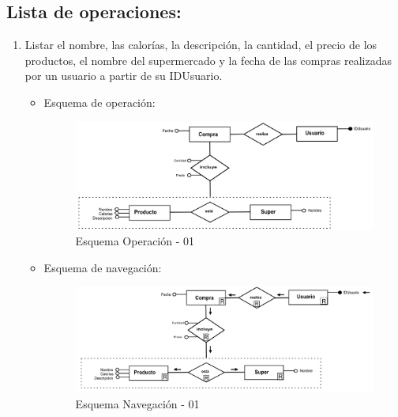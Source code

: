 \documentclass[a4paper,12pt]{report}
\begin{document}
\subsection{Lista de operaciones:}
\label{sec-7-1-1}
\begin{enumerate}
\item Listar el nombre, las calorías, la descripción, la cantidad, el precio de los productos, el nombre del supermercado y la fecha de las compras realizadas por un usuario a partir de su IDUsuario.
\begin{itemize}
\item Esquema de operación:
\begin{figure}[!htp]
\centering
\includegraphics[width=0.9\linewidth]{./operaciones/img/Compras/01_ope.png}
\caption{Esquema Operación - 01}
\label{fig:ope01}
\medskip
\footnotesize
{}
\end{figure}
\item Esquema de navegación:
\begin{figure}[!htp]
\centering
\includegraphics[width=0.9\linewidth]{./operaciones/img/Compras/01_nav.png}
\caption{Esquema Navegación - 01}
\label{fig:nave01}
\medskip
\footnotesize
{}
\end{figure}
\end{itemize}


\end{enumerate}
\end{document}
